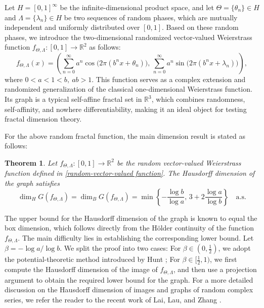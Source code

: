 \documentclass[12pt, reqno]{amsart}
\theoremstyle{plain}
\newtheorem{theorem}{Theorem}[section]
\theoremstyle{definition}
\theoremstyle{remark}
\begin{document}
Let \( H = [0,1]^\infty \) be the infinite-dimensional product space, and let
\( \Theta = \{\theta_n\} \in H \) and \( \Lambda = \{\lambda_n\} \in H \)
be two sequences of random phases, which are mutually independent and uniformly distributed over \([0,1]\). Based on these random phases, we introduce the two-dimensional randomized vector-valued Weierstrass function
\( f_{\Theta,\Lambda}: [0,1] \to \mathbb{R}^2 \) as follows:
\begin{equation}\label{random-vector-valued function}
f_{\Theta,\Lambda}(x) = \left(
\sum_{n=0}^{\infty} a^n \cos\bigl(2\pi (b^n x + \theta_n)\bigr),\,  \sum_{n=0}^{\infty} a^n \sin\bigl(2\pi (b^n x + \lambda_n)\bigr)
\right),
\end{equation}
where $ 0<a<1<b,\ ab> 1$. This function serves as a complex extension and randomized generalization of the classical one-dimensional Weierstrass function. Its graph is a typical self-affine fractal set in  $\mathbb{R}^3$, which combines randomness, self-affinity, and nowhere differentiability, making it an ideal object for testing fractal dimension theory.

For the above random fractal function, the main dimension result is stated as follows:

\begin{theorem}\label{main thm}
	Let \( f_{\Theta,\Lambda}: [0,1] \to \mathbb{R}^2 \) be the random vector-valued Weierstrass function defined in \eqref{random-vector-valued function}. The Hausdorff dimension of the graph satisfies
	\[
	\dim_H G(f_{\Theta,\Lambda}) =\dim_B G(f_{\Theta,\Lambda}) = \min\left\{-\frac{\log b}{\log a}, \, 3 +2\frac{\log a}{\log b}\right\} \quad \text{a.s.}
	\]
\end{theorem}

The upper bound for the Hausdorff dimension of the graph is known to equal the box dimension, which follows directly from the H\"older continuity of the function \(f_{\Theta,\Lambda}\). The main difficulty lies in establishing the corresponding lower bound. Let \(\beta = -{\log a}/{\log b}\). We split the proof into two cases: For \(\beta \in (0, \frac{1}{2})\), we adopt the potential-theoretic method introduced by Hunt \cite{Hunt1998}; For \(\beta \in [\frac{1}{2}, 1)\), we first compute the Hausdorff dimension of the image of \(f_{\Theta,\Lambda}\), and then use a projection argument to obtain the required lower bound for the graph. For a more detailed discussion on the Hausdorff dimension of images and graphs of random complex series, we refer the reader to the recent work of Lai, Lau, and Zhang \cite{LaiLauZhang2026}.
	
\end{document}
